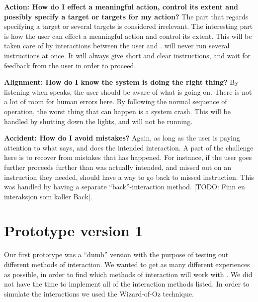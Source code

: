 \textbf{Action: How do I effect a meaningful action, control its extent and possibly specify a target or targets for my action?}
The part that regards specifying a target or several targets is considered irrelevant. The interesting part is how the user can effect a meaningful action and control its extent. This will be taken care of by interactions between the user and \buddy{}. \buddy{} will never run several instructions at once. It will always give short and clear instructions, and wait for feedback from the user in order to proceed. 

\textbf{Alignment: How do I know the system is doing the right thing?}
By listening when \buddy{} speaks, the user should be aware of what is going on. There is not a lot of room for human errors here. By following the normal sequence of operation, the worst thing that can happen is a system crash. This will be handled by shutting down the lights, and \buddy{} will not be running.  

\textbf{Accident: How do I avoid mistakes?}
Again, as long as the user is paying attention to what \buddy{} says, and does the intended interaction. A part of the challenge here is to recover from mistakes that has happened. For instance, if the user goes further proceeds further than was actually intended, and missed out on an instruction they needed, \buddy{} should have a way to go back to missed instruction. This was handled by having a separate ``back''-interaction method.
[TODO: Finn en interaksjon som kaller Back].   


 

\section{Prototype version 1}
\label{sec:proto1}
Our first prototype was a ``dumb'' version with the purpose of testing out different methods of interaction. We wanted to get as many different experiences as possible, in order to find which methods of interaction will work with \ab{}. We did not have the time to implement all of the interaction methods listed. In order to simulate the interactions we used the Wizard-of-Oz technique\cite{wilson1988rapid}. 


